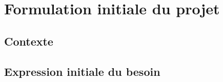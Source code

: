 \chapter{Formulation initiale du projet}



\section{Contexte}



\section{Expression initiale du besoin}